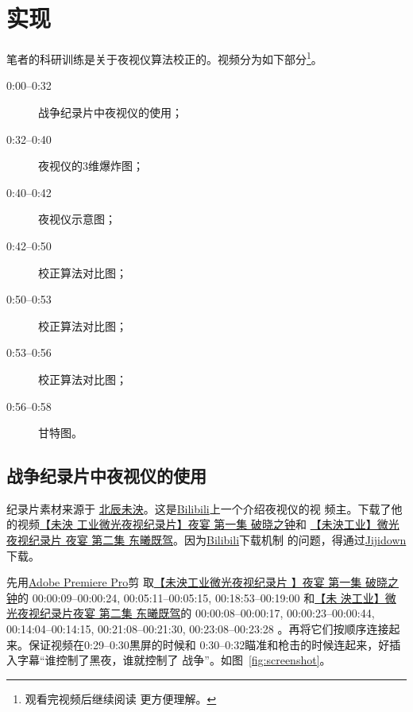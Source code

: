 \documentclass[../main]{subfiles}
\begin{document}
\chapter{实现}%
\label{cha:realize}

笔者的科研训练是关于夜视仪算法校正的。视频分为如下部分\footnote{观看完视频后继续阅读
更方便理解。}。

\begin{description}
  \item[0:00--0:32]战争纪录片中夜视仪的使用；
  \item[0:32--0:40]夜视仪的3维爆炸图；
  \item[0:40--0:42]夜视仪示意图；
  \item[0:42--0:50]校正算法对比图；
  \item[0:50--0:53]校正算法对比图；
  \item[0:53--0:56]校正算法对比图；
  \item[0:56--0:58]甘特图。
\end{description}

\section{战争纪录片中夜视仪的使用}%
\label{sec:video}

纪录片素材来源于
\href{https://space.bilibili.com/3267707?spm_id_from=333.788.b_765f7570696e666f.2}{%
北辰未泱}。这是\href{https://www.bilibili.com/}{Bilibili}上一个介绍夜视仪的视
频主。下载了他的视频\href{https://www.bilibili.com/video/BV1sx411j7oh}{【未泱
工业微光夜视纪录片】夜宴 第一集 破晓之钟}和
\href{https://www.bilibili.com/video/BV1CW411H7J7}{【未泱工业】微光夜视纪录片
夜宴 第二集 东曦既驾}。因为\href{https://www.bilibili.com/}{Bilibili}下载机制
的问题，得通过\href{https://www.jijidown.com/}{Jijidown}下载。

先用\href{https://www.adobe.com/products/premiere.html}{Adobe Premiere Pro}剪
取\href{https://www.bilibili.com/video/BV1sx411j7oh}{【未泱工业微光夜视纪录片
】夜宴 第一集 破晓之钟}的 00:00:09--00:00:24, 00:05:11--00:05:15,
00:18:53--00:19:00 和\href{https://www.bilibili.com/video/BV1CW411H7J7}{【未
泱工业】微光夜视纪录片夜宴 第二集 东曦既驾}的 00:00:08--00:00:17,
00:00:23--00:00:44, 00:14:04--00:14:15, 00:21:08--00:21:30,
00:23:08--00:23:28 。再将它们按顺序连接起来。保证视频在0:29--0:30黒屏的时候和
0:30--0:32瞄准和枪击的时候连起来，好插入字幕\enquote{谁控制了黑夜，谁就控制了
战争}。如图~\ref{fig:screenshot}。
\end{document}
